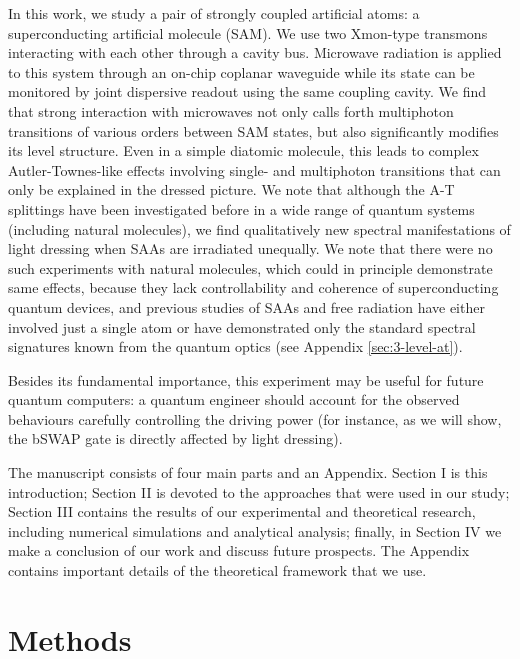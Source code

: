 \documentclass[%
 pra,
 amsmath,amssymb,
 reprint,%
]{revtex4-1}
\begin{document}
In this work, we study a pair of strongly coupled 
artificial atoms: a superconducting artificial 
molecule\cite{kou2017fluxonium} (SAM). We use two 
Xmon-type\cite{barends2013coherent} 
transmons\cite{koch2007charge} interacting with 
each other through a cavity 
bus\cite{majer2007coupling}. Microwave radiation 
is applied to this system through an on-chip 
coplanar waveguide while its state can be 
monitored by joint dispersive readout using the 
same coupling cavity\cite{chow2010detecting}. We 
find that strong interaction with microwaves not 
only calls forth multiphoton transitions of 
various orders between SAM states, but also 
significantly modifies its level structure. Even 
in a simple diatomic molecule, this leads to 
complex Autler-Townes-like effects involving 
single- and multiphoton  transitions that can 
only be explained in the dressed picture. We note 
that although the A-T splittings have been 
investigated before in a wide range of quantum 
systems (including natural 
molecules\cite{tamarat1995pump, 
ahmed2012autler}), we find qualitatively new 
spectral manifestations of light dressing when 
SAAs are irradiated unequally. We note that there 
were no such experiments with natural molecules, 
which could in principle demonstrate same 
effects, because they lack controllability and 
coherence of superconducting quantum devices, and 
previous studies of SAAs and free radiation have 
either involved just a single atom or have 
demonstrated only the standard spectral 
signatures known from the quantum optics (see 
Appendix \ref{sec:3-level-at}). 

Besides its fundamental importance, this 
experiment may be useful for future quantum 
computers: a quantum engineer should account for 
the observed behaviours carefully controlling the 
driving power (for instance, as we will show, the 
bSWAP gate\cite{poletto2012entanglement} is 
directly affected by light dressing).

The manuscript consists of four main parts and an 
Appendix. Section I is this introduction; Section 
II is devoted to the approaches that were used in 
our study; Section III contains the results of 
our experimental and theoretical research, 
including numerical simulations and analytical 
analysis; finally, in Section IV we make a 
conclusion of our work and discuss future 
prospects. The Appendix contains important 
details of the theoretical framework that we use.

\section{Methods}
\end{document}
